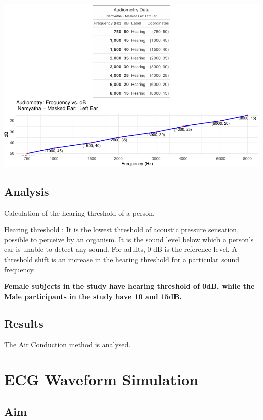 \documentclass[
  11pt,
  letterpaper,
  DIV=11,
  numbers=noendperiod]{scrreprt}
\begin{document}
\includegraphics{audiometry_files/figure-pdf/unnamed-chunk-8-1.pdf}

\section{Analysis}\label{analysis-4}

Calculation of the hearing threshold of a person.

Hearing threshold : It is the lowest threshold of acoustic pressure
sensation, possible to perceive by an organism. It is the sound level
below which a person's ear is unable to detect any sound. For adults, 0
dB is the reference level. A threshold shift is an increase in the
hearing threshold for a particular sound frequency.

\textbf{Female subjects in the study have hearing threshold of 0dB,
while the Male participants in the study have 10 and 15dB.}

\section{Results}\label{results}

The Air Conduction method is analysed.


\chapter{ECG Waveform Simulation}\label{ecg-waveform-simulation}

\section{Aim}\label{aim-5}
\end{document}
